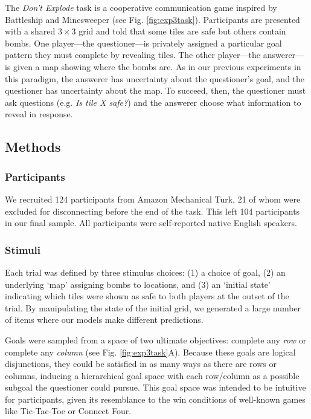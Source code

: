 \documentclass[12pt, floatsintext, jou]{apa6}
\begin{document}
The \emph{Don't Explode} task is a cooperative communication game inspired by Battleship and Minesweeper (see Fig. \ref{fig:exp3task}). 
Participants are presented with a shared $3 \times 3$ grid and told that some tiles are safe but others contain bombs.
One player---the questioner---is privately assigned a particular goal pattern they must complete by revealing tiles.
The other player---the answerer---is given a map showing where the bombs are.
As in our previous experiments in this paradigm, the answerer has uncertainty about the questioner's goal, and the questioner has uncertainty about the map.
To succeed, then, the questioner must ask questions (e.g. \emph{Is tile X safe?}) and the answerer choose what information to reveal in response.

\subsection{Methods}

\subsubsection{Participants}

We recruited 124 participants from Amazon Mechanical Turk, 21 of whom were excluded for disconnecting before the end of the task. 
This left 104 participants in our final sample. 
All participants were self-reported native English speakers.

\subsubsection{Stimuli}

Each trial was defined by three stimulus choices: (1) a choice of goal, (2) an underlying `map' assigning bombs to locations, and (3) an `initial state' indicating which tiles were shown as safe to both players at the outset of the trial.
By manipulating the state of the initial grid, we generated a large number of items where our models make different predictions. 

Goals were sampled from a space of two ultimate objectives: complete any \emph{row} or complete any \emph{column} (see Fig. \ref{fig:exp3task}A).
Because these goals are logical disjunctions, they could be satisfied in as many ways as there are rows or columns, inducing a hierarchical goal space with each row/column as a possible subgoal the questioner could pursue.
This goal space was intended to be intuitive for participants, given its resemblance to the win conditions of well-known games like Tic-Tac-Toe or Connect Four.
\end{document}
